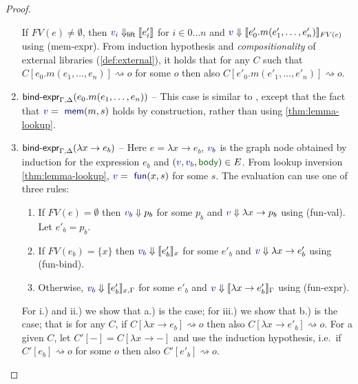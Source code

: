 \documentclass[english,crc,references=cleveref]{programming}
\theoremstyle{plain}
\theoremstyle{definition}
\newcommand{\ident}[1]{\textnormal{\textcolor{idclr}{\sffamily #1}}}
\newcommand{\bndclr}[1]{\textcolor{kvdclr}{#1}}
\newcommand{\bnd}[1]{\textnormal{\textcolor{kvdclr}{\sffamily #1}}}
\newcommand{\blbl}[1]{\textnormal{\textcolor{numclr}{\sffamily #1}}}
\newcommand{\rname}[1]{{\sffamily(#1)}}
\begin{document}
\begin{proof}
\begin{enumerate}
  If $FV(e)\neq\emptyset$, then $\bndclr{v_i} \Downarrow_\ident{lift} \llbracket e'_i \rrbracket$ for $i\in 0\ldots n$ and
  $\bndclr{v}\Downarrow \llbracket e'_0.m(e'_1, \ldots, e'_n) \rrbracket_{FV(e)}$ using \rname{mem-expr}.
  From induction hypothesis and \emph{compositionality} of external libraries (\cref{def:external}),
  it holds that for any $C$ such that $C[e_0.m(e_1, \ldots, e_n)] \rightsquigarrow o$ for some $o$
  then also $C[e'_0.m(e'_1, \ldots, e'_n)] \rightsquigarrow o$.

\item  $\ident{bind-expr}_{\Gamma, \Delta}(e_0.m(e_1, \ldots, e_n))$ --
  This case is similar to , except that the fact that $\bndclr{v} = \bnd{mem}(m, s)$
  holds by construction, rather than using \cref{thm:lemma-lookup}.

\item \label{itm:3} $\ident{bind-expr}_{\Gamma, \Delta}(\lambda x\rightarrow e_b)$ --
  Here $e = \lambda x\rightarrow e_b$, $\bndclr{v_b}$ is the graph node obtained by induction
  for the expression $e_b$ and $(\bndclr{v}, \bndclr{v_b}, \blbl{body}) \in E$.
  From lookup inversion \cref{thm:lemma-lookup}, $\bndclr{v} = \bnd{fun}(x, s)$ for some $s$.
  The evaluation can use one of three rules:

  \begin{enumerate}
    \renewcommand{\theenumii}{\roman{enumii}}%
  \item
  If $FV(e)=\emptyset$ then $\bndclr{v_b}\Downarrow p_b$ for some $p_b$ and $\bndclr{v}\Downarrow \lambda x\rightarrow p_b$
  using \rname{fun-val}. Let $e'_b=p_b$.

  \item
  If $FV(e_b)=\{x\}$ then $\bndclr{v_b}\Downarrow \llbracket e'_b \rrbracket_x$ for some $e'_b$ and
  $\bndclr{v}\Downarrow \lambda x\rightarrow e'_b$ using \rname{fun-bind}.

  \item
  Otherwise, $\bndclr{v_b}\Downarrow \llbracket e'_b \rrbracket_{x,\Gamma}$ for some $e'_b$ and
  $\bndclr{v}\Downarrow \llbracket\lambda x\rightarrow e'_b\rrbracket_\Gamma$ using \rname{fun-expr}.
  \end{enumerate}
%
%
For i.) and ii.) we show that a.) is the case; for iii.) we show that b.) is the case; that is
for any $C$, if $C[\lambda x\rightarrow e_b] \rightsquigarrow o$ then also
$C[\lambda x\rightarrow e'_b] \rightsquigarrow o$. For a given $C$, let $C'[-] = C[\lambda x\rightarrow -]$
and use the induction hypothesis, i.\hairspace e.~if $C'[e_b] \rightsquigarrow o$ for some $o$ then also $C'[e'_b] \rightsquigarrow o$.


\end{enumerate}
\end{proof}
\end{document}
